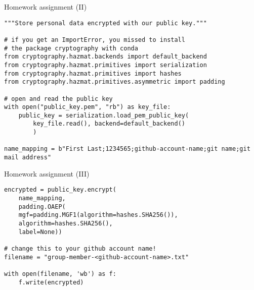 \begin{frame}[fragile]{Homework assignment (II)}

	\begin{verbatim}
"""Store personal data encrypted with our public key."""

# if you get an ImportError, you missed to install
# the package cryptography with conda
from cryptography.hazmat.backends import default_backend
from cryptography.hazmat.primitives import serialization
from cryptography.hazmat.primitives import hashes
from cryptography.hazmat.primitives.asymmetric import padding

# open and read the public key
with open("public_key.pem", "rb") as key_file:
    public_key = serialization.load_pem_public_key(
        key_file.read(), backend=default_backend()
        )

name_mapping = b"First Last;1234565;github-account-name;git name;git mail address"
	\end{verbatim}

\end{frame}

\begin{frame}[fragile]{Homework assignment (III)}

	\begin{verbatim}
encrypted = public_key.encrypt(
    name_mapping,
    padding.OAEP(
    mgf=padding.MGF1(algorithm=hashes.SHA256()),
    algorithm=hashes.SHA256(),
    label=None))

# change this to your github account name!
filename = "group-member-<github-account-name>.txt"

with open(filename, 'wb') as f:
    f.write(encrypted)\end{verbatim}

	\end{frame}


